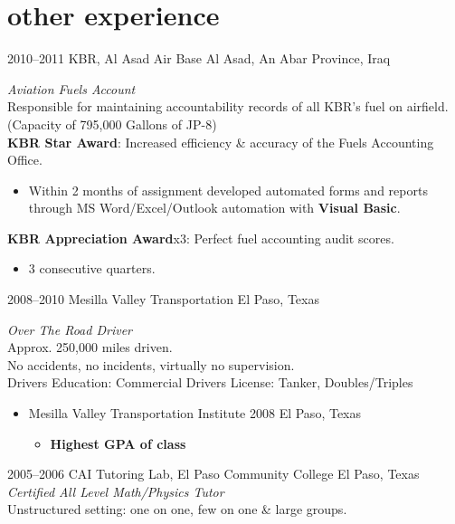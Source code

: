 \documentclass[]{friggeri-cv} %
\begin{document}

\section{other experience}

\begin{entrylist}
\entry
{2010--2011}
{KBR, Al Asad Air Base}
{Al Asad, An Abar Province, Iraq}
{\emph{Aviation Fuels Account} \\
Responsible for maintaining accountability records of all KBR's fuel on airfield. 
(Capacity of 795,000 Gallons of JP-8) \\
\textbf{KBR Star Award}: Increased efficiency \& accuracy of the Fuels Accounting Office.
\begin{itemize}
\item Within 2 months of assignment developed automated forms and reports through MS Word/Excel/Outlook automation with \textbf{Visual Basic}.
\end{itemize}
\textbf{KBR Appreciation Award}x3: Perfect fuel accounting audit scores.
\begin{itemize}
\item 3 consecutive quarters.
\end{itemize}}
\entry
{2008--2010}
{Mesilla Valley Transportation}
{El Paso, Texas}
{\emph{Over The Road Driver} \\
Approx. 250,000 miles driven. \\
No accidents, no incidents, virtually no supervision. \\
Drivers Education: Commercial Drivers License: Tanker, Doubles/Triples
\begin{itemize}
\item Mesilla Valley Transportation Institute 2008 El Paso, Texas
\begin{itemize}
\item \textbf{Highest GPA of class}
\end{itemize}
\end{itemize}}
\entry
{2005--2006}
{CAI Tutoring Lab, El Paso Community College}
{El Paso, Texas}
{\emph{Certified All Level Math/Physics Tutor} \\
Unstructured setting: one on one, few on one \& large groups.}

\end{entrylist}
\end{document}
